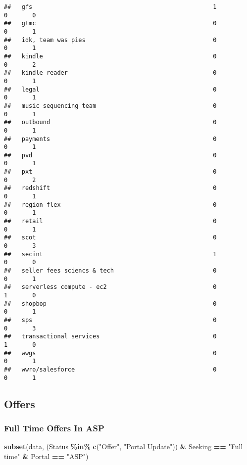 \documentclass[
]{article}
\newenvironment{Shaded}{\begin{snugshade}}{\end{snugshade}}
\newcommand{\FunctionTok}[1]{\textcolor[rgb]{0.13,0.29,0.53}{\textbf{#1}}}
\newcommand{\NormalTok}[1]{#1}
\newcommand{\SpecialCharTok}[1]{\textcolor[rgb]{0.81,0.36,0.00}{\textbf{#1}}}
\newcommand{\StringTok}[1]{\textcolor[rgb]{0.31,0.60,0.02}{#1}}
\begin{document}
\begin{verbatim}
##   gfs                                                   1             0       0
##   gtmc                                                  0             0       1
##   idk, team was pies                                    0             0       1
##   kindle                                                0             0       2
##   kindle reader                                         0             0       1
##   legal                                                 0             0       1
##   music sequencing team                                 0             0       1
##   outbound                                              0             0       1
##   payments                                              0             0       1
##   pvd                                                   0             0       1
##   pxt                                                   0             0       2
##   redshift                                              0             0       1
##   region flex                                           0             0       1
##   retail                                                0             0       1
##   scot                                                  0             0       3
##   secint                                                1             0       0
##   seller fees sciencs & tech                            0             0       1
##   serverless compute - ec2                              0             1       0
##   shopbop                                               0             0       1
##   sps                                                   0             0       3
##   transactional services                                0             1       0
##   wwgs                                                  0             0       1
##   wwro/salesforce                                       0             0       1
\end{verbatim}

\hypertarget{offers}{%
\subsection{Offers}\label{offers}}

\hypertarget{full-time-offers-in-asp}{%
\subsubsection{Full Time Offers In ASP}\label{full-time-offers-in-asp}}

\begin{Shaded}
\begin{Highlighting}[]
\FunctionTok{subset}\NormalTok{(data, (Status }\SpecialCharTok{\%in\%} \FunctionTok{c}\NormalTok{(}\StringTok{"Offer"}\NormalTok{, }\StringTok{"Portal Update"}\NormalTok{)) }\SpecialCharTok{\&}\NormalTok{ Seeking }\SpecialCharTok{==} \StringTok{"Full time"} \SpecialCharTok{\&}\NormalTok{ Portal }\SpecialCharTok{==} \StringTok{"ASP"}\NormalTok{)}
\end{Highlighting}
\end{Shaded}
\end{document}
